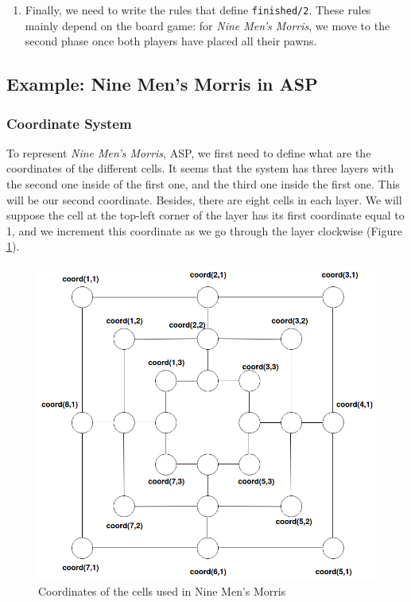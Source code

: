 \begin{enumerate}
\smallskip

Then, we add \texttt{phase/2} in the definition of \texttt{can\_play/3}. For example, if the two players can only play an action of type $a$ in the first phase, and of type $b$ in the second one, then it is equivalent to: \newline
\texttt{can\_play(Player, a, T) :- turn(Player, T), phase(phase(1),T).}\\
\texttt{can\_play(Player, b, T) :- turn(Player, T), phase(phase(2),T).}

\item Finally, we need to write the rules that define \texttt{finished/2}. These rules mainly depend on the board game: for \textit{Nine Men's Morris}, we move to the second phase once both players have placed all their pawns.
\end{enumerate}

\subsection{Example: Nine Men's Morris in ASP}

\subsubsection{Coordinate System}

To represent \textit{Nine Men's Morris}, ASP, we first need to define what are the coordinates of the different cells. It seems that the system has three layers with the second one inside of the first one, and the third one inside the first one. This will be our second coordinate. Besides, there are eight cells in each layer. We will suppose the cell at the top-left corner of the layer has its first coordinate equal to 1, and we increment this coordinate as we go through the layer clockwise (Figure \ref{fig:9MM_coord}).

\begin{figure}[h]
\centering
\includegraphics[width = 0.8\hsize]{figures/9MM_coord.png}
\caption{Coordinates of the cells used in Nine Men's Morris}
\label{fig:9MM_coord}
\end{figure}

